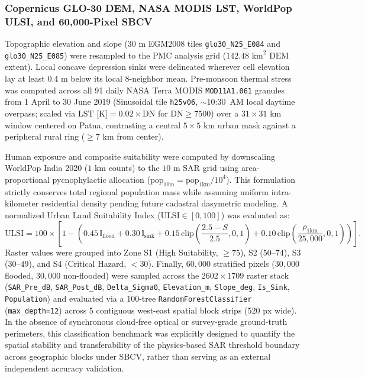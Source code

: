 \documentclass[OA,linenum]{InterPore}
\begin{document}
\subsubsection{Copernicus GLO-30 DEM, NASA MODIS LST, WorldPop ULSI, and 60,000-Pixel SBCV}

Topographic elevation and slope ($30\text{ m}$ EGM2008 tiles \texttt{glo30\_N25\_E084} and \texttt{glo30\_N25\_E085}) were resampled to the PMC analysis grid ($142.48\text{ km}^2$ DEM extent). Local concave depression sinks were delineated wherever cell elevation lay at least $0.4\text{ m}$ below its local 8-neighbor mean. Pre-monsoon thermal stress was computed across all 91 daily NASA Terra MODIS \texttt{MOD11A1.061} granules from 1 April to 30 June 2019 (Sinusoidal tile \texttt{h25v06}, $\sim$10:30~AM local daytime overpass; scaled via $\text{LST [K]} = 0.02 \times \text{DN}$ for $\text{DN} \ge 7500$) over a $31 \times 31\text{ km}$ window centered on Patna, contrasting a central $5 \times 5\text{ km}$ urban mask against a peripheral rural ring ($\ge 7\text{ km}$ from center).

Human exposure and composite suitability were computed by downscaling WorldPop India 2020 ($1\text{ km}$ counts) to the $10\text{ m}$ SAR grid using area-proportional pycnophylactic allocation ($\text{pop}_{10\text{m}} = \text{pop}_{1\text{km}} / 10^4$). This formulation strictly conserves total regional population mass while assuming uniform intra-kilometer residential density pending future cadastral dasymetric modeling. A normalized Urban Land Suitability Index ($\text{ULSI} \in [0, 100]$) was evaluated as:
\begin{equation}
    \text{ULSI} = 100 \times \left[1 - \left(0.45\,\mathbb{I}_{\text{flood}} + 0.30\,\mathbb{I}_{\text{sink}} + 0.15\,\text{clip}\!\left(\frac{2.5 - S}{2.5}, 0, 1\right) + 0.10\,\text{clip}\!\left(\frac{\rho_{1\text{km}}}{25,000}, 0, 1\right)\right)\right].
\end{equation}
Raster values were grouped into Zone S1 (High Suitability, $\ge 75$), S2 ($50$--$74$), S3 ($30$--$49$), and S4 (Critical Hazard, $< 30$). Finally, $60,000$ stratified pixels ($30,000$ flooded, $30,000$ non-flooded) were sampled across the $2602 \times 1709$ raster stack (\texttt{SAR\_Pre\_dB}, \texttt{SAR\_Post\_dB}, \texttt{Delta\_Sigma0}, \texttt{Elevation\_m}, \texttt{Slope\_deg}, \texttt{Is\_Sink}, \texttt{Population}) and evaluated via a 100-tree \texttt{RandomForestClassifier} (\texttt{max\_depth=12}) across 5 contiguous west-east spatial block strips ($520\text{ px}$ wide). In the absence of synchronous cloud-free optical or survey-grade ground-truth perimeters, this classification benchmark was explicitly designed to quantify the spatial stability and transferability of the physics-based SAR threshold boundary across geographic blocks under SBCV, rather than serving as an external independent accuracy validation.
\end{document}
